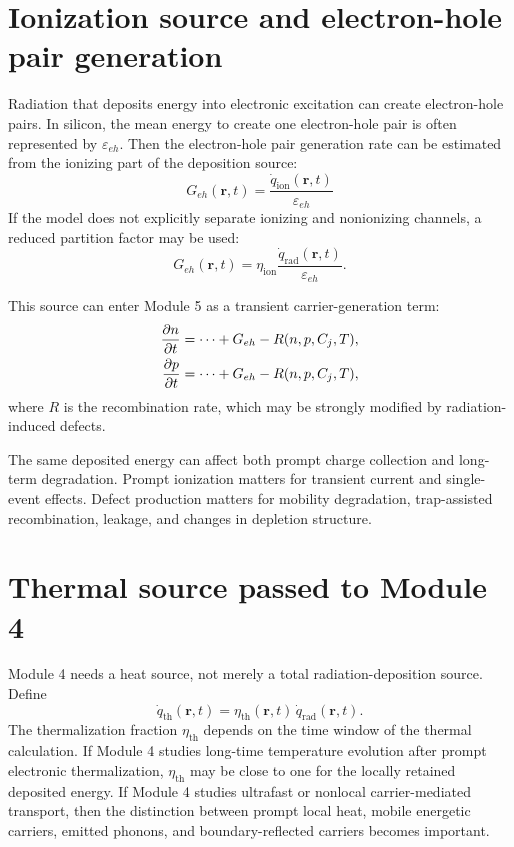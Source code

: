 \documentclass[11pt]{article}
\newcommand{\qrad}{\dot{q}_{\mathrm{rad}}}
\newcommand{\qth}{\dot{q}_{\mathrm{th}}}
\newcommand{\qion}{\dot{q}_{\mathrm{ion}}}
\newcommand{\rpos}{\mathbf{r}}
\newcommand{\epspair}{\varepsilon_{eh}}
\newcommand{\Geh}{G_{eh}}
\begin{document}
\section{Ionization source and electron-hole pair generation}

Radiation that deposits energy into electronic excitation can create electron-hole pairs. In silicon, the mean energy to create one electron-hole pair is often represented by $\epspair$. Then the electron-hole pair generation rate can be estimated from the ionizing part of the deposition source:
\begin{equation}
\boxed{
\Geh(\rpos,t)
=
\frac{\qion(\rpos,t)}{\epspair}
}
\label{eq:geh_from_qion}
\end{equation}
If the model does not explicitly separate ionizing and nonionizing channels, a reduced partition factor may be used:
\begin{equation}
\Geh(\rpos,t)
=
\eta_{\mathrm{ion}}\frac{\qrad(\rpos,t)}{\epspair}.
\label{eq:geh_from_qrad_eta}
\end{equation}

This source can enter Module 5 as a transient carrier-generation term:
\begin{align}
\pdv{n}{t} &= \cdots + \Geh - R(n,p,C_j,T), \\
\pdv{p}{t} &= \cdots + \Geh - R(n,p,C_j,T),
\end{align}
where $R$ is the recombination rate, which may be strongly modified by radiation-induced defects.

\begin{notebox}
The same deposited energy can affect both prompt charge collection and long-term degradation. Prompt ionization matters for transient current and single-event effects. Defect production matters for mobility degradation, trap-assisted recombination, leakage, and changes in depletion structure.
\end{notebox}

\section{Thermal source passed to Module 4}

Module 4 needs a heat source, not merely a total radiation-deposition source. Define
\begin{equation}
\qth(\rpos,t) = \eta_{\mathrm{th}}(\rpos,t)\,\qrad(\rpos,t).
\label{eq:qth_from_qrad}
\end{equation}
The thermalization fraction $\eta_{\mathrm{th}}$ depends on the time window of the thermal calculation. If Module 4 studies long-time temperature evolution after prompt electronic thermalization, $\eta_{\mathrm{th}}$ may be close to one for the locally retained deposited energy. If Module 4 studies ultrafast or nonlocal carrier-mediated transport, then the distinction between prompt local heat, mobile energetic carriers, emitted phonons, and boundary-reflected carriers becomes important.
\end{document}
